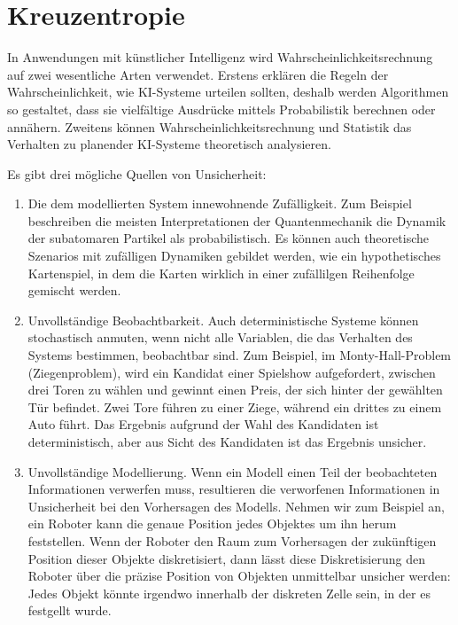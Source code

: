 \section{Kreuzentropie}
In Anwendungen mit künstlicher Intelligenz wird Wahrscheinlichkeitsrechnung auf zwei wesentliche Arten verwendet. Erstens erklären die Regeln der Wahrscheinlichkeit, wie KI-Systeme urteilen sollten, deshalb werden Algorithmen so gestaltet, dass sie vielfältige Ausdrücke mittels Probabilistik berechnen oder annähern. Zweitens können Wahrscheinlichkeitsrechnung und Statistik das Verhalten zu planender KI-Systeme theoretisch analysieren.
\cite{goodfellow2016deeplearning}

Es gibt drei mögliche Quellen von Unsicherheit:

\begin{enumerate}

\item Die dem modellierten System innewohnende Zufälligkeit. Zum Beispiel beschreiben die meisten Interpretationen der Quantenmechanik die Dynamik der subatomaren Partikel als probabilistisch. Es können auch theoretische Szenarios mit zufälligen Dynamiken gebildet werden, wie ein hypothetisches Kartenspiel, in dem die Karten wirklich in einer zufällilgen Reihenfolge gemischt werden.

\item Unvollständige Beobachtbarkeit. Auch deterministische Systeme können stochastisch anmuten, wenn nicht alle Variablen, die das Verhalten des Systems bestimmen, beobachtbar sind. Zum Beispiel, im Monty-Hall-Problem (Ziegenproblem), wird ein Kandidat einer Spielshow aufgefordert, zwischen drei Toren zu wählen und gewinnt einen Preis, der sich hinter der gewählten Tür befindet. Zwei Tore führen zu einer Ziege, während ein drittes zu einem Auto führt. Das Ergebnis aufgrund der Wahl des Kandidaten ist deterministisch, aber aus Sicht des Kandidaten ist das Ergebnis unsicher.

\item Unvollständige Modellierung. Wenn ein Modell einen Teil der beobachteten Informationen verwerfen muss, resultieren die verworfenen Informationen in Unsicherheit bei den Vorhersagen des Modells. Nehmen wir zum Beispiel an, ein Roboter kann die genaue Position jedes Objektes um ihn herum feststellen. Wenn der Roboter den Raum zum Vorhersagen der zukünftigen Position dieser Objekte diskretisiert, dann lässt diese Diskretisierung den Roboter über die präzise Position von Objekten unmittelbar unsicher werden: Jedes Objekt könnte irgendwo innerhalb der diskreten Zelle sein, in der es festgellt wurde.

\end{enumerate}

